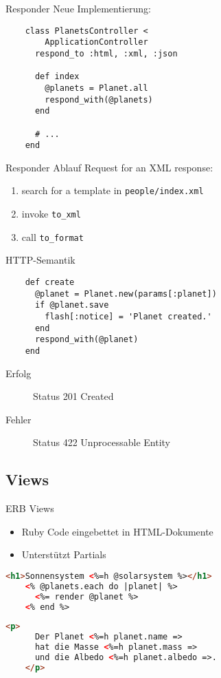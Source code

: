 \begin{frame}[fragile]{Responder}
  Neue Implementierung:
  \begin{lstlisting}
    class PlanetsController <
        ApplicationController
      respond_to :html, :xml, :json

      def index
        @planets = Planet.all
        respond_with(@planets)
      end

      # ...
    end
  \end{lstlisting}
\end{frame}

\begin{frame}{Responder Ablauf}
  Request for an XML response:
  \begin{enumerate}
    \item search for a template in \lstinline|people/index.xml|
    \item invoke \lstinline|to_xml|
    \item call \lstinline|to_format|
  \end{enumerate}
\end{frame}

\begin{frame}[fragile]{HTTP-Semantik}
  \begin{lstlisting}
    def create
      @planet = Planet.new(params[:planet])
      if @planet.save
        flash[:notice] = 'Planet created.'
      end
      respond_with(@planet)
    end
  \end{lstlisting}

  \begin{description}
    \item[Erfolg] Status 201 Created
    \item[Fehler] Status 422 Unprocessable Entity
  \end{description}
\end{frame}

\subsection{Views}

\begin{frame}[fragile]{ERB Views}
  \begin{itemize}
    \item Ruby Code eingebettet in HTML-Dokumente
    \item Unterstützt Partials
  \end{itemize}

  \begin{lstlisting}[language=HTML]
    <h1>Sonnensystem <%=h @solarsystem %></h1>
    <% @planets.each do |planet| %>
      <%= render @planet %>
    <% end %>
  \end{lstlisting}

  \begin{lstlisting}[language=HTML]
    <p>
      Der Planet <%=h planet.name =>
      hat die Masse <%=h planet.mass =>
      und die Albedo <%=h planet.albedo =>.
    </p>
  \end{lstlisting}
\end{frame}

